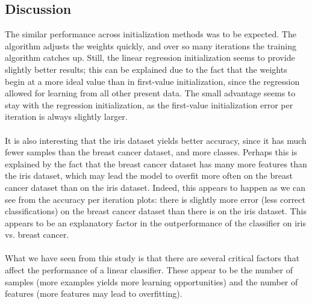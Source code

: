\documentclass[11pt]{article}
\begin{document}
\subsection{Discussion}
The similar performance across initialization methods was to be expected. The algorithm adjusts the weights quickly, and over so many iterations the training algorithm catches up. Still, the linear regression initialization seems to provide slightly better results; this can be explained due to the fact that the weights begin at a more ideal value than in first-value initialization, since the regression allowed for learning from all other present data. The small advantage seems to stay with the regression initialization, as the first-value initialization error per iteration is always slightly larger. \\
 \\
It is also interesting that the iris dataset yields better accuracy, since it has much fewer samples than the breast cancer dataset, and more classes. Perhaps this is explained by the fact that the breast cancer dataset has many more features than the iris dataset, which may lead the model to overfit more often on the breast cancer dataset than on the iris dataset. Indeed, this appears to happen as we can see from the accuracy per iteration plots: there is slightly more error (less correct classifications) on the breast cancer dataset than there is on the iris dataset. This appears to be an explanatory factor in the outperformance of the classifier on iris vs. breast cancer.\\
 \\
What we have seen from this study is that there are several critical factors that affect the performance of a linear classifier. These appear to be the number of samples (more examples yields more learning opportunities) and the number of features (more features may lead to overfitting).
\end{document}
